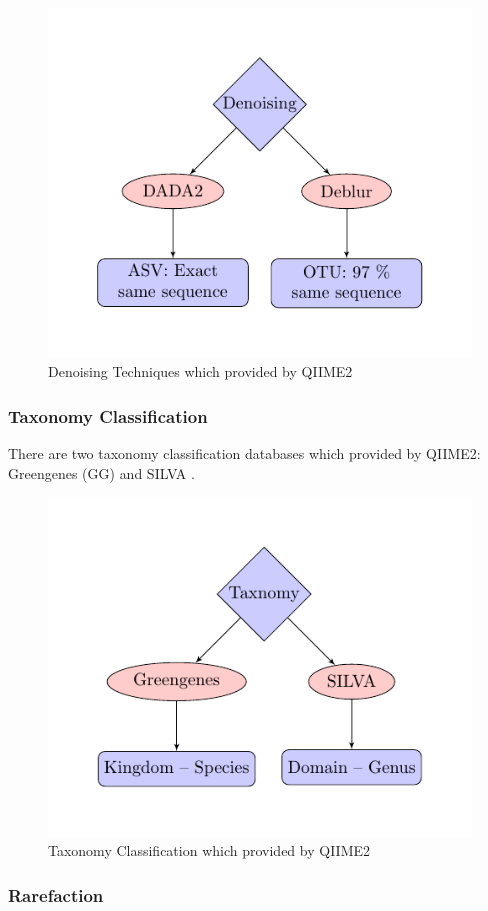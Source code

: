 \documentclass[a4paper]{article}
\begin{document}
                \begin{figure}[p]
                    \centering
                    \includegraphics[width=0.5 \linewidth]{figures/denoising/denoising.pdf}
                    \caption{Denoising Techniques which provided by QIIME2}
                    \label{fig:denosing-workflow}
                \end{figure}

            \subsubsection{Taxonomy Classification}
                There are two taxonomy classification databases which provided by QIIME2: Greengenes (GG) \cite{greengenes1} and SILVA \cite{silva1}.

                \begin{figure}[p]
                    \centering
                    \includegraphics[width=0.5 \linewidth]{figures/taxonomy/taxonomy.pdf}
                    \caption{Taxonomy Classification which provided by QIIME2}
                    \label{fig:taxonomy-workflow}
                \end{figure}

            \subsubsection{Rarefaction}
\end{document}
